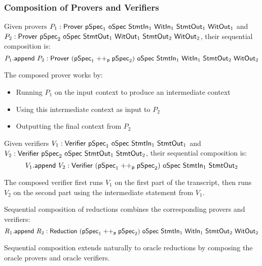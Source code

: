 \subsubsection{Composition of Provers and Verifiers}

\begin{definition}
    \label{def:prover_append}
    Given provers $P_1 : \Prover\ \pSpec_1\ \oSpec\ \StmtIn_1\ \WitIn_1\ \StmtOut_1\ \WitOut_1$ and $P_2 : \Prover\ \pSpec_2\ \oSpec\ \StmtOut_1\ \WitOut_1\ \StmtOut_2\ \WitOut_2$, their sequential composition is:
    \[ P_1.\append\ P_2 : \Prover\ (\pSpec_1 \mathrel{++_\mathsf{p}} \pSpec_2)\ \oSpec\ \StmtIn_1\ \WitIn_1\ \StmtOut_2\ \WitOut_2 \]

    The composed prover works by:
    \begin{itemize}
        \item Running $P_1$ on the input context to produce an intermediate context
        \item Using this intermediate context as input to $P_2$
        \item Outputting the final context from $P_2$
    \end{itemize}
\end{definition}

\begin{definition}
    \label{def:verifier_append}
    Given verifiers $V_1 : \Verifier\ \pSpec_1\ \oSpec\ \StmtIn_1\ \StmtOut_1$ and $V_2 : \mathsf{Verifier}\ \mathsf{pSpec}_2\ \mathsf{oSpec}\ \mathsf{StmtOut}_1\ \mathsf{StmtOut}_2$, their sequential composition is:
    \[ V_1.\append\ V_2 : \Verifier\ (\pSpec_1 \mathrel{++_\mathsf{p}} \pSpec_2)\ \oSpec\ \StmtIn_1\ \StmtOut_2 \]

    The composed verifier first runs $V_1$ on the first part of the transcript, then runs $V_2$ on the second part using the intermediate statement from $V_1$.
\end{definition}

\begin{definition}
    \label{def:reduction_append}
    Sequential composition of reductions combines the corresponding provers and verifiers:
    \[ R_1.\append\ R_2 : \Reduction\ (\pSpec_1 \mathrel{++_\mathsf{p}} \pSpec_2)\ \oSpec\ \StmtIn_1\ \WitIn_1\ \StmtOut_2\ \WitOut_2 \]
\end{definition}

\begin{definition}
    \label{def:oracle_reduction_append}
    Sequential composition extends naturally to oracle reductions by composing the oracle provers and oracle verifiers.
\end{definition}

